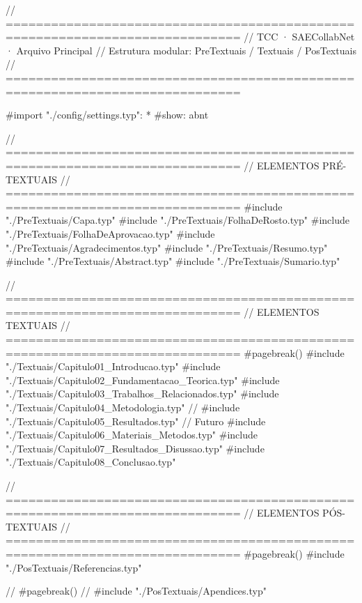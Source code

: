 // =============================================================================
// TCC · SAECollabNet · Arquivo Principal
// Estrutura modular: PreTextuais / Textuais / PosTextuais
// =============================================================================

#import "./config/settings.typ": *
#show: abnt

// =============================================================================
// ELEMENTOS PRÉ-TEXTUAIS
// =============================================================================
#include "./PreTextuais/Capa.typ"
#include "./PreTextuais/FolhaDeRosto.typ"
#include "./PreTextuais/FolhaDeAprovacao.typ"
#include "./PreTextuais/Agradecimentos.typ"
#include "./PreTextuais/Resumo.typ"
#include "./PreTextuais/Abstract.typ"
#include "./PreTextuais/Sumario.typ"

// =============================================================================
// ELEMENTOS TEXTUAIS
// =============================================================================
#pagebreak()
#include "./Textuais/Capitulo01_Introducao.typ"
#include "./Textuais/Capitulo02_Fundamentacao_Teorica.typ"
#include "./Textuais/Capitulo03_Trabalhos_Relacionados.typ"
#include "./Textuais/Capitulo04_Metodologia.typ"
// #include "./Textuais/Capitulo05_Resultados.typ"  // Futuro
#include "./Textuais/Capitulo06_Materiais_Metodos.typ"
#include "./Textuais/Capitulo07_Resultados_Disussao.typ"
#include "./Textuais/Capitulo08_Conclusao.typ"

// =============================================================================
// ELEMENTOS PÓS-TEXTUAIS
// =============================================================================
#pagebreak()
#include "./PosTextuais/Referencias.typ"

// #pagebreak()
// #include "./PosTextuais/Apendices.typ"
